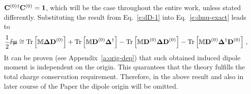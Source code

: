 \documentclass[aip,graphicx]{revtex4-1}
\newcommand{\BM}[1]{\bm{#1}}
\DeclareMathOperator{\Tr}{Tr}
\begin{document}
${\bf C}^{(0)\dagger}{\bf C}^{(0)}={\bf 1}$,
which will be the case throughout the entire work, unless stated differently.
Substituting the result from Eq.~\eqref{e:dD-1}
into Eq.~\eqref{e:dmu-exact} leads to
%
\begin{equation} \label{e:dmu-4-exact.linear-approximation}
 \frac{1}{2} 
 \delta {\BM{\upmu}}
  \cong
   \Tr{ 
    \left[ 
         {\mathbb{M}} {\BM\Delta} {\bf D}^{(0)}  
    \right] }
%
  +\Tr{ 
    \left[ 
         {\mathbb{M}} {\bf D}^{(0)} {\BM\Delta}^{\dagger}
    \right] }
%
  -\Tr{ 
    \left[ 
         {\mathbb{M}} {\bf D}^{(0)} {\BM\Delta} {\bf D}^{(0)}
    \right] }
%
  -\Tr{ 
    \left[ 
         {\mathbb{M}} {\bf D}^{(0)} {\BM\Delta}^{\dagger} {\bf D}^{(0)}
    \right] } \;,
\end{equation}
%
It can be proven (see Appendix~\ref{a:orig-dep}) that such obtained
induced dipole moment is independent on the origin. 
This quarantees that the theory fulfills the total charge conservation requirement.
Therefore,
in the above result and also in later course of the Paper the dipole origin will be omitted. 
\end{document}
